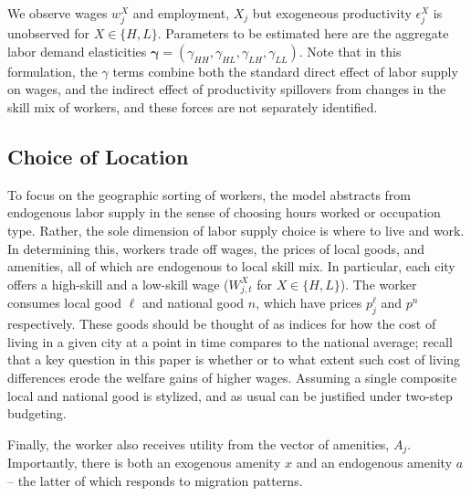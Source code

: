 \documentclass{article}
\begin{document}
We observe wages $w_{j}^X$ and employment, $X_{j}$ but exogeneous productivity $\epsilon_{j}^X$ is unobserved for $X \in \{H, L\}$. Parameters to be estimated here are the aggregate labor demand elasticities $\bm{\gamma} = (\gamma_{HH}, \gamma_{HL}, \gamma_{LH}, \gamma_{LL})$. Note that in this formulation,  the $\gamma$ terms combine both the standard direct effect of labor supply on wages, and the indirect effect of productivity spillovers from changes in the skill mix of workers, and these forces are not separately identified. 

\subsection{Choice of Location}


To focus on the geographic sorting of workers, the model abstracts from endogenous labor supply in the sense of choosing hours worked or occupation type. Rather, the sole dimension of labor supply choice is where to live and work. In determining this, workers trade off wages, the prices of local goods, and amenities, all of which are endogenous to local skill mix. In particular, each city offers a high-skill and a low-skill wage ($W_{j,t}^X$ for $X \in \{H, L\}$). The worker consumes local good $\ell$ and national good $n$, which have prices $p^\ell_{j}$ and $p^n$ respectively. These goods should be thought of as indices for how the cost of living in a given city at a point in time compares to the national average; recall that a key question in this paper is whether or to what extent such cost of living differences erode the welfare gains of higher wages. Assuming a single composite local and national good is stylized, and as usual can be justified under two-step budgeting.

Finally, the worker also receives utility from the vector of amenities, $A_{j}$. Importantly, there is both an exogenous amenity $x$ and an endogenous amenity $a$ -- the latter of which responds to migration patterns. 
\end{document}
